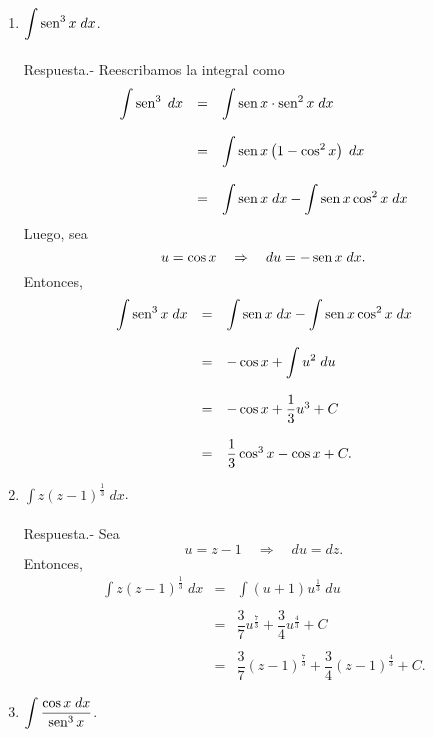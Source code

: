 \begin{enumerate}[\bfseries 1.]
    \item $\displaystyle\int \mathop{\mbox{\normalfont sen}}\nolimits^3 x\; dx$.\\\\
	Respuesta.-\; Reescribamos la integral como
	$$\begin{array}{rcl}
	    \displaystyle \int \mathop{\mbox{\normalfont sen}}\nolimits^3 \; dx &=& \displaystyle\int \mathop{\mbox{\normalfont sen}}\nolimits x\cdot \mathop{\mbox{\normalfont sen}}\nolimits^2 x \; dx\\\\
					    &=& \displaystyle \int \mathop{\mbox{\normalfont sen}}\nolimits x\left(1-\cos^2 x\right)\; dx\\\\
					    &=& \displaystyle \int \mathop{\mbox{\normalfont sen}}\nolimits x \; dx - \int \mathop{\mbox{\normalfont sen}}\nolimits x \cos^2 x \; dx
	\end{array}$$
	Luego, sea
	$$u=\cos x \quad \Rightarrow \quad du=-\mathop{\mbox{\normalfont sen}}\nolimits x\; dx.$$
	Entonces,
	$$\begin{array}{rcl}
	    \displaystyle \int \mathop{\mbox{\normalfont sen}}\nolimits^3 x \; dx &=& \displaystyle \int \mathop{\mbox{\normalfont sen}}\nolimits x \; dx-\int \mathop{\mbox{\normalfont sen}}\nolimits x\cos^2 x \; dx\\\\
					      &=&-\cos x + \displaystyle \int u^2 \; du\\\\
					      &=& - \cos x + \dfrac{1}{3}u^3+C\\\\
					      &=& \dfrac{1}{3}\cos^3 x - \cos x +C.
	\end{array}$$
	\vspace{.5cm}

    \item $\displaystyle\int z(z-1)^{\frac{1}{3}}\; dx$.\\\\
	Respuesta.-\; Sea
	$$u=z-1\quad \Rightarrow \quad du=dz.$$
	Entonces,
	$$\begin{array}{rcl}
	    \displaystyle \int z(z-1)^{\frac{1}{3}}\; dx &=& \displaystyle \int (u+1)u^{\frac{1}{3}}\; du\\\\
							 &=& \dfrac{3}{7}u^{\frac{7}{3}} + \dfrac{3}{4}u^{\frac{4}{3}}+C\\\\
							 &=& \dfrac{3}{7}(z-1)^{\frac{7}{3}} + \dfrac{3}{4}(z-1)^{\frac{4}{3}}+C.
	\end{array}$$
	\vspace{.5cm}

    \item $\displaystyle\int \dfrac{\cos x \; dx}{\mathop{\mbox{\normalfont sen}}\nolimits^3 x}$.\\\\


\end{enumerate}
